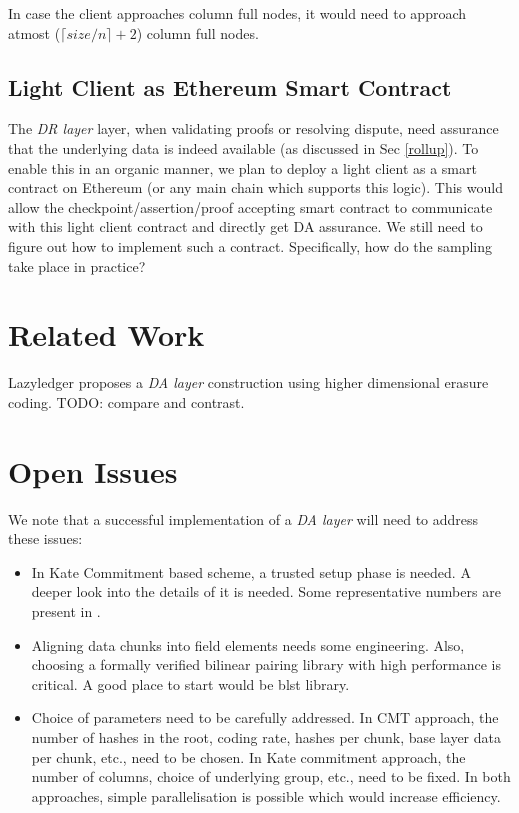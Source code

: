 \documentclass[sigconf, screen=true, nonacm]{acmart}
\newcommand{\DA}{\textit{DA layer}}
\newcommand{\DR}{\textit{DR layer}}
\begin{document}
        In case the client approaches column full nodes, it would need to approach atmost ($\lceil size/n \rceil + 2$) column full nodes. 
    
    \subsection{Light Client as Ethereum Smart Contract}
        The \DR{} layer, when validating proofs or resolving dispute, need assurance that the underlying data is indeed available (as discussed in Sec \ref{rollup}). To enable this in an organic manner, we plan to deploy a light client as a smart contract on Ethereum (or any main chain which supports this logic). This would allow the checkpoint/assertion/proof accepting smart contract to communicate with this light client contract and directly get DA assurance. We still need to figure out how to implement such a contract. Specifically, how do the sampling take place in practice?

\section{Related Work}
    Lazyledger \cite{lazyledger} proposes a \DA{} construction using higher dimensional erasure coding. TODO: compare and contrast. 

\section{Open Issues}
    We note that a successful implementation of a \DA{} will need to address these issues:
    \begin{itemize}
        \item In Kate Commitment based scheme, a trusted setup phase is needed. A deeper look into the details of it is needed. Some representative numbers are present in \cite{dankrad_poly:2019}.
        \item Aligning data chunks into field elements needs some engineering. Also, choosing a formally verified bilinear pairing library with high performance is critical. A good place to start would be blst library. 
        \item Choice of parameters need to be carefully addressed. In CMT approach, the number of hashes in the root, coding rate, hashes per chunk, base layer data per chunk, etc., need to be chosen. In Kate commitment approach, the number of columns, choice of underlying group, etc., need to be fixed. In both approaches, simple parallelisation is possible which would increase efficiency. 
    \end{itemize}



\end{document}
